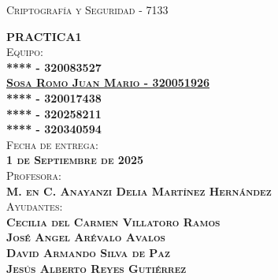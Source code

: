 \begin{titlepage}
\begin{minipage}[c][0.81\textheight][t]{0.75\textwidth}
\begin{center}
			{\large\scshape Criptografía y Seguridad - 7133}\\[.2in]
			
			\vspace{2cm}            
			
			\textsc{\LARGE \textbf{P}\hspace{1cm}\textbf{R}\hspace{1cm}\textbf{A}\hspace{1cm}\textbf{C}\hspace{1cm}\textbf{T}\hspace{1cm}\textbf{I}\hspace{1cm}\textbf{C}\hspace{1cm}\textbf{A}\hspace{1.3cm}\textbf{1}}\\[2cm]
			\textsc{\Large{Equipo:}\normalsize \\
                \vspace{.3cm}
				\textbf{**** - 320083527 \\
                \vspace{.2cm}
				\href{https://github.com/JuanSosaCiencias}{{Sosa Romo Juan Mario - 320051926}} \\
                \vspace{.2cm}
				**** - 320017438 \\
                \vspace{.2cm}
                **** - 320258211 \\
                \vspace{.2cm}
                **** - 320340594}}\\[0.5cm]     
			
			\textsc{{Fecha de entrega: \\ \textbf{1 de Septiembre de 2025}}}\\[0.5cm]        
			
			\textsc{{Profesora: \\ \textbf{M. en C. Anayanzi Delia Martínez Hernández}}}\\[0.5cm]  
			
			\textsc{Ayudantes: \\ \textbf{Cecilia del Carmen Villatoro Ramos \\ José Angel Arévalo Avalos \\ David Armando Silva de Paz \\ Jesús Alberto Reyes Gutiérrez
			} }
			
			
			\vspace{0.5cm}
		\end{center}
	\end{minipage}
\end{titlepage}
